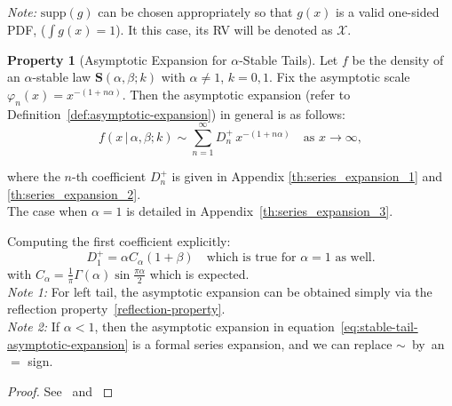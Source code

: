 \documentclass{article}
\theoremstyle{definition}
\newtheorem{property}[definition]{Property}
\begin{document}
\textit{Note:} \(\mathrm{supp}(g)\) can be chosen appropriately so that \(g(x)\) is a valid one-sided PDF, (\(\int g(x)=1\)). It this case, its RV will be denoted as \(\mathcal{X}\).
\begin{property}[Asymptotic Expansion for \(\alpha\)-Stable Tails]\label{pr:asymptotic-expansion}
Let $f$ be the density of an \(\alpha\)-stable law \(\mathbf{S}(\alpha,\beta;k)\) with \(\alpha\neq1\), \(k=0,1\).  Fix the asymptotic scale \(\varphi_n(x)=x^{-(1+n\alpha)}\). Then the asymptotic expansion (refer to Definition~\ref{def:asymptotic-expansion}) in general is as follows:
\begin{equation}\label{eq:stable-tail-asymptotic-expansion}
f(x\,|\,\alpha,\beta;k) \sim \sum_{n=1}^\infty D_n^+\,x^{-(1+n\alpha)} \quad \text{as } x \to \infty,
\end{equation}

where the \(n\)-th coefficient \(D_n^+\) is given in Appendix \ref{th:series_expansion_1} and  \ref{th:series_expansion_2}.\\
The case when \(\alpha=1\) is detailed in Appendix~\ref{th:series_expansion_3}.
\end{property}

Computing the first coefficient explicitly:
\[
D_1^+ = \alpha C_\alpha (1 + \beta)
\quad \text{which is true for } \alpha=1 \text{ as well.}\]
with \( C_\alpha = \frac{1}{\pi} \Gamma{(\alpha)} \sin{\frac{\pi \alpha}{2}}\) which is expected.\\
\textit{Note 1:} For left tail, the asymptotic expansion can be obtained simply via the reflection property~\ref{reflection-property}.\\
\textit{Note 2:} If \(\alpha<1\), then the asymptotic expansion in equation~\ref{eq:stable-tail-asymptotic-expansion} is a formal series expansion, and we can replace \(\sim\)~by~an~\(=\) sign.
\begin{proof}
See~\cite{NolanJohnP2020USDM} and \cite{alma991009672269709436}
\end{proof}
\end{document}
